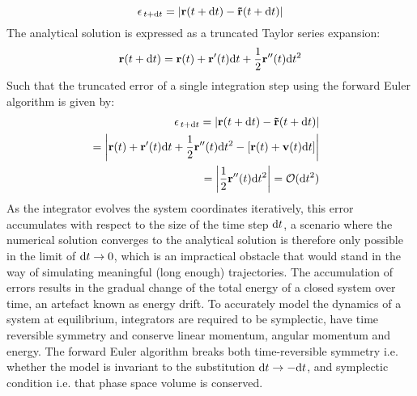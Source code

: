\begin{equation}
    \epsilon_{\,t+\mathrm{d}t} = \left|\mathbf{r}(t+\mathrm{d}t) - \mathbf{\tilde{r}}(t+\mathrm{d}t)\right|
\end{equation}
The analytical solution is expressed as a truncated Taylor series expansion:
\begin{equation}
    \mathbf{r}(t+\dt) = \mathbf{r}(t) + \mathbf{r'}(t)\dt + \frac{1}{2}\mathbf{r''}(t)\dt^2 %
\end{equation}
Such that the truncated error of a single integration step using the forward Euler algorithm is given by:
\begin{subequations} \label{eq:euler_error}
\begin{align}
\begin{split}
    \epsilon_{\,t+\mathrm{d}t} &= \left|\mathbf{r}(t+\mathrm{d}t) - \mathbf{\tilde{r}}(t+\mathrm{d}t)\right|
\end{split}\\
\begin{split}
    &=  \left|\mathbf{r}(t) + \mathbf{r'}(t)\mathrm{d}t + \frac{1}{2}\mathbf{r''}(t)\mathrm{d}t^2 - \left[   \mathbf{r}(t) + \mathbf{v}(t)\mathrm{d}t   \right]\right|
\end{split}\\
\begin{split}
    &= \left| \frac{1}{2} \mathbf{r''}(t)\mathrm{d}t^2 \right| = \mathcal{O}(\mathrm{d}t^2)
\end{split}
\end{align}
\end{subequations}
\vspace{-0.1cm}
As the integrator evolves the system coordinates iteratively, this error accumulates with respect to the size of the time step $\mathrm{d}t$, a scenario where the numerical solution converges to the analytical solution is therefore only possible in the limit of $\mathrm{d}t \rightarrow 0$, which is an impractical obstacle that would stand in the way of simulating meaningful (long enough) trajectories. The accumulation of errors results in the gradual change of the total energy of a closed system over time, an artefact known as energy drift. To accurately model the dynamics of a system at equilibrium, integrators are required to be symplectic, have time reversible symmetry and conserve linear momentum, angular momentum and energy. The forward Euler algorithm breaks both time-reversible symmetry i.e. whether the model is invariant to the substitution $\mathrm{d}t \rightarrow -\mathrm{d}t$, and symplectic condition i.e. that phase space volume is conserved. 

